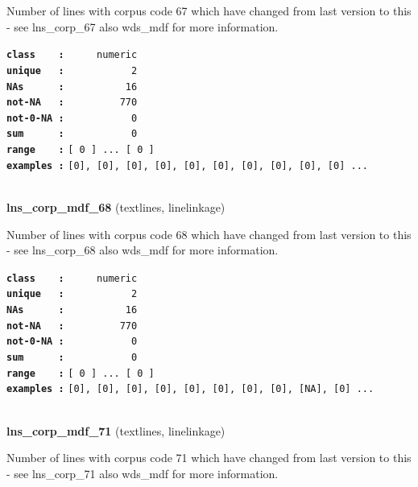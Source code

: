 \documentclass[]{article}
\begin{document}
Number of lines with corpus code 67 which have changed from last version
to this - see lns\_corp\_67 also wds\_mdf for more information.

\textbf{\texttt{class\ \ \ \ :}} \texttt{~~~~~numeric}\\
\textbf{\texttt{unique\ \ \ :}} \texttt{~~~~~~~~~~~2}\\
\textbf{\texttt{NAs\ \ \ \ \ \ :}} \texttt{~~~~~~~~~~16}\\
\textbf{\texttt{not-NA\ \ \ :}} \texttt{~~~~~~~~~770}\\
\textbf{\texttt{not-0-NA\ :}} \texttt{~~~~~~~~~~~0}\\
\textbf{\texttt{sum\ \ \ \ \ \ :}} \texttt{~~~~~~~~~~~0}\\
\textbf{\texttt{range\ \ \ \ :}}
\texttt{{[}\ 0\ {]}\ ...\ {[}\ 0\ {]}}\\
\textbf{\texttt{examples\ :}}
\texttt{{[}0{]},\ {[}0{]},\ {[}0{]},\ {[}0{]},\ {[}0{]},\ {[}0{]},\ {[}0{]},\ {[}0{]},\ {[}0{]},\ {[}0{]}\ ...}\\

~

\textbf{lns\_corp\_mdf\_68} (textlines, linelinkage)

Number of lines with corpus code 68 which have changed from last version
to this - see lns\_corp\_68 also wds\_mdf for more information.

\textbf{\texttt{class\ \ \ \ :}} \texttt{~~~~~numeric}\\
\textbf{\texttt{unique\ \ \ :}} \texttt{~~~~~~~~~~~2}\\
\textbf{\texttt{NAs\ \ \ \ \ \ :}} \texttt{~~~~~~~~~~16}\\
\textbf{\texttt{not-NA\ \ \ :}} \texttt{~~~~~~~~~770}\\
\textbf{\texttt{not-0-NA\ :}} \texttt{~~~~~~~~~~~0}\\
\textbf{\texttt{sum\ \ \ \ \ \ :}} \texttt{~~~~~~~~~~~0}\\
\textbf{\texttt{range\ \ \ \ :}}
\texttt{{[}\ 0\ {]}\ ...\ {[}\ 0\ {]}}\\
\textbf{\texttt{examples\ :}}
\texttt{{[}0{]},\ {[}0{]},\ {[}0{]},\ {[}0{]},\ {[}0{]},\ {[}0{]},\ {[}0{]},\ {[}0{]},\ {[}NA{]},\ {[}0{]}\ ...}\\

~

\textbf{lns\_corp\_mdf\_71} (textlines, linelinkage)

Number of lines with corpus code 71 which have changed from last version
to this - see lns\_corp\_71 also wds\_mdf for more information.
\end{document}
